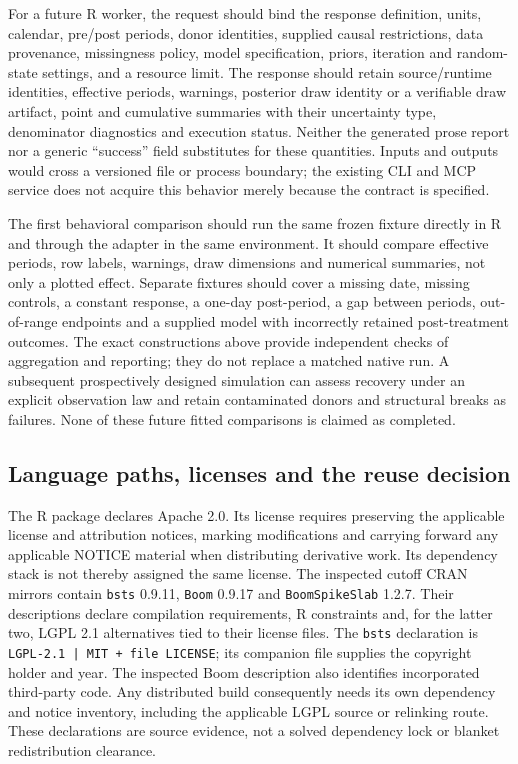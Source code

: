 For a future R worker, the request should bind the response definition,
units, calendar, pre/post periods, donor identities, supplied causal
restrictions, data provenance, missingness policy, model specification,
priors, iteration and random-state settings, and a resource limit. The
response should retain source/runtime identities, effective periods,
warnings, posterior draw identity or a verifiable draw artifact, point and
cumulative summaries with their uncertainty type, denominator diagnostics
and execution status. Neither the generated prose report nor a generic
``success'' field substitutes for these quantities. Inputs and outputs would
cross a versioned file or process boundary; the existing CLI and MCP service
does not acquire this behavior merely because the contract is specified.
\citep{exec13_ci_reuse}

The first behavioral comparison should run the same frozen fixture directly
in R and through the adapter in the same environment. It should compare
effective periods, row labels, warnings, draw dimensions and numerical
summaries, not only a plotted effect. Separate fixtures should cover a missing
date, missing controls, a constant response, a one-day post-period, a gap
between periods, out-of-range endpoints and a supplied model with incorrectly
retained post-treatment outcomes. The exact constructions above provide
independent checks of aggregation and reporting; they do not replace a
matched native run. A subsequent prospectively designed simulation can
assess recovery under an explicit observation law and retain contaminated
donors and structural breaks as failures. None of these future fitted
comparisons is claimed as completed. \citep{exec13_ci_reuse}

\subsection{Language paths, licenses and the reuse decision}

The R package declares Apache 2.0. Its license requires preserving the
applicable license and attribution notices, marking modifications and
carrying forward any applicable NOTICE material when distributing derivative
work. Its dependency stack is not thereby assigned the same license. The
inspected cutoff CRAN mirrors contain \texttt{bsts} 0.9.11,
\texttt{Boom} 0.9.17 and \texttt{BoomSpikeSlab} 1.2.7. Their descriptions
declare compilation requirements, R constraints and, for the latter two,
LGPL 2.1 alternatives tied to their license files. The \texttt{bsts}
declaration is \texttt{LGPL-2.1 | MIT + file LICENSE}; its companion file
supplies the copyright holder and year. The inspected Boom description also
identifies incorporated third-party code. Any distributed build consequently
needs its own dependency and notice inventory, including the applicable
LGPL source or relinking route. These declarations are source evidence, not
a solved dependency lock or blanket redistribution clearance.
\citep{exec13_ci_r,exec13_ci_dependencies}

